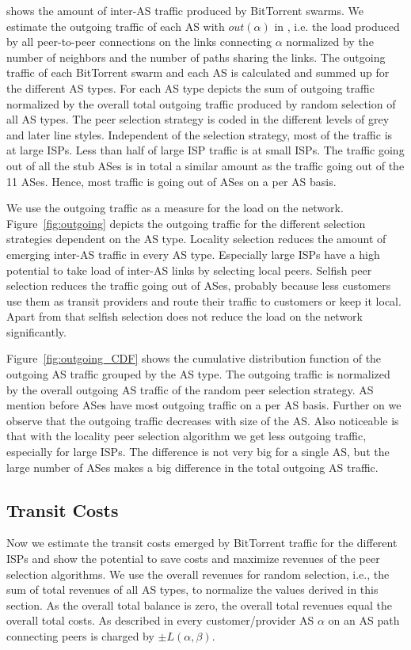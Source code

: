  shows the amount of inter-AS traffic produced by BitTorrent swarms. We estimate the outgoing traffic of each AS with $out(\alpha)$ in , i.e. the load produced by all peer-to-peer connections on the links connecting $\alpha$ normalized by the number of neighbors and the number of paths sharing the links. The outgoing traffic of each BitTorrent swarm and each AS is calculated and summed up for the different AS types. For each AS type  depicts the sum of outgoing traffic normalized by the overall total outgoing traffic produced by random selection of all AS types. The peer selection strategy is coded in the different levels of grey and later line styles. Independent of the selection strategy, most of the traffic is at large ISPs. Less than half of large ISP traffic is at small ISPs. The traffic going out of all the stub ASes is in total a similar amount as the traffic going out of the 11 \tier ASes. Hence, most traffic is going out of \tier ASes on a per AS basis.

We use the outgoing traffic as a measure for the load on the network.
Figure~\ref{fig:outgoing} depicts the outgoing traffic for the different selection strategies dependent on the AS type. Locality selection reduces the amount of emerging inter-AS traffic in every AS type. Especially large ISPs have a high potential to take load of inter-AS links by selecting local peers. Selfish peer selection reduces the traffic going out of \tier ASes, probably because less customers use them as transit providers and route their traffic to customers or keep it local. Apart from that selfish selection does not reduce the load on the network significantly.

Figure~\ref{fig:outgoing_CDF} shows the cumulative distribution function of the outgoing AS traffic grouped by the AS type. The outgoing traffic is normalized by the overall outgoing AS traffic of the random peer selection strategy. AS mention before \tier ASes have most outgoing traffic on a per AS basis. Further on we observe that the outgoing traffic decreases with size of the AS. Also noticeable is that with the locality peer selection algorithm we get less outgoing traffic, especially for large ISPs. The difference is not very big for a single AS, but the large number of ASes makes a big difference in the total outgoing AS traffic.

\subsection{Transit Costs}
Now we estimate the transit costs emerged by BitTorrent traffic for the different ISPs and show the potential to save costs and maximize revenues of the peer selection algorithms. We use the overall revenues for random selection, i.e., the sum of total revenues of all AS types, to normalize the values derived in this section. As the overall total balance is zero, the overall total revenues equal the overall total costs.
As described in  every customer/provider AS $\alpha$ on an AS path connecting peers is charged by $\pm L(\alpha,\beta)$.

